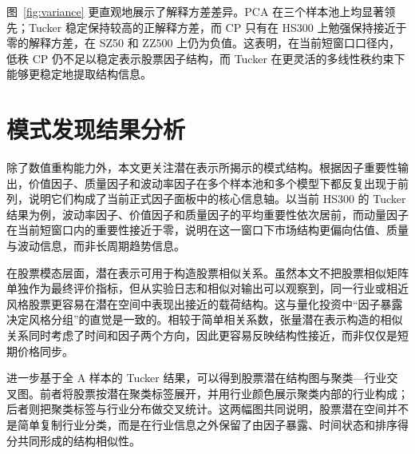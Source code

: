 图~\ref{fig:variance} 更直观地展示了解释方差差异。PCA 在三个样本池上均显著领先；Tucker 稳定保持较高的正解释方差，而 CP 只有在 HS300 上勉强保持接近于零的解释方差，在 SZ50 和 ZZ500 上仍为负值。这表明，在当前短窗口口径内，低秩 CP 仍不足以稳定表示股票因子结构，而 Tucker 在更灵活的多线性秩约束下能够更稳定地提取结构信息。

\section{模式发现结果分析}

除了数值重构能力外，本文更关注潜在表示所揭示的模式结构。根据因子重要性输出，价值因子、质量因子和波动率因子在多个样本池和多个模型下都反复出现于前列，说明它们构成了当前正式因子面板中的核心信息轴。以当前 HS300 的 Tucker 结果为例，波动率因子、价值因子和质量因子的平均重要性依次居前，而动量因子在当前短窗口内的重要性接近于零，说明在这一窗口下市场结构更偏向估值、质量与波动信息，而非长周期趋势信息。

在股票模态层面，潜在表示可用于构造股票相似关系。虽然本文不把股票相似矩阵单独作为最终评价指标，但从实验日志和相似对输出可以观察到，同一行业或相近风格股票更容易在潜在空间中表现出接近的载荷结构。这与量化投资中“因子暴露决定风格分组”的直觉是一致的。相较于简单相关系数，张量潜在表示构造的相似关系同时考虑了时间和因子两个方向，因此更容易反映结构性接近，而非仅仅是短期价格同步。

进一步基于全 A 样本的 Tucker 结果，可以得到股票潜在结构图与聚类—行业交叉图。前者将股票按潜在聚类标签展开，并用行业颜色展示聚类内部的行业构成；后者则把聚类标签与行业分布做交叉统计。这两幅图共同说明，股票潜在空间并不是简单复制行业分类，而是在行业信息之外保留了由因子暴露、时间状态和排序得分共同形成的结构相似性。


